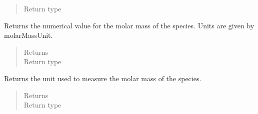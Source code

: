 \documentclass[letterpaper,10pt,openany,oneside,english]{sphinxmanual}
\begin{document}
\begin{fulllineitems}
\begin{fulllineitems}
\begin{quote}
\begin{description}
\item[{Return type}] \leavevmode
{}

\end{description}\end{quote}

\end{fulllineitems}


\begin{fulllineitems}
\label{\detokenize{support_rst/specie:specie.Specie.molarMass}}
Returns the numerical value for the molar mass of the species. Units
are given by molarMassUnit.
\begin{quote}\begin{description}
\item[{Returns}] \leavevmode
{}

\item[{Return type}] \leavevmode
{}

\end{description}\end{quote}

\end{fulllineitems}


\begin{fulllineitems}
\label{\detokenize{support_rst/specie:specie.Specie.molarMassUnit}}
Returns the unit used to measure the molar mass of the species.
\begin{quote}\begin{description}
\item[{Returns}] \leavevmode
{}

\item[{Return type}] \leavevmode
{}

\end{description}\end{quote}

\end{fulllineitems}



\end{fulllineitems}
\end{document}
